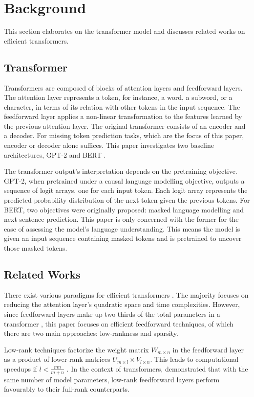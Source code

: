 \section{Background}
\label{sec:background}
This section elaborates on the transformer model and discusses related works on efficient transformers.
\subsection{Transformer}
Transformers \cite{vaswani_attention_2017} are composed of blocks of attention layers and feedforward layers. The attention layer represents a token, for instance, a word, a subword, or a character, in terms of its relation with other tokens in the input sequence. The feedforward layer applies a non-linear transformation to the features learned by the previous attention layer. The original transformer \cite{vaswani_attention_2017} consists of an encoder and a decoder. For missing token prediction tasks, which are the focus of this paper, encoder or decoder alone suffices. This paper investigates two baseline architectures, GPT-2 \cite{radford_language_nodate} and BERT \cite{devlin_bert_2019}. 

The transformer output's interpretation depends on the pretraining objective. GPT-2, when pretrained under a causal language modelling objective, outputs a sequence of logit arrays, one for each input token. Each logit array represents the predicted probability distribution of the next token given the previous tokens. For BERT, two objectives were originally proposed: masked language modelling and next sentence prediction. This paper is only concerned with the former for the ease of assessing the model's language understanding. This means the model is given an input sequence containing masked tokens and is pretrained to uncover those masked tokens.
\subsection{Related Works}
There exist various paradigms for efficient transformers \cite{tay_efficient_2022}. The majority focuses on reducing the attention layer's quadratic space and time complexities. However, since feedforward layers make up two-thirds of the total parameters in a transformer \cite{pires_one_2023}, this paper focuses on efficient feedforward techniques, of which there are two main approaches: low-rankness and sparsity.

Low-rank techniques factorize the weight matrix $W_{m\times n}$ in the feedforward layer as a product of lower-rank matrices $U_{m\times l}\times V_{l\times n}$. This leads to computational speedups if $l <\frac{mn}{m+n}$ \cite{kamalakara_exploring_2022}. In the context of transformers, \cite{winata_lightweight_2020} demonstrated that with the same number of model parameters, low-rank feedforward layers perform favourably to their full-rank counterparts.

